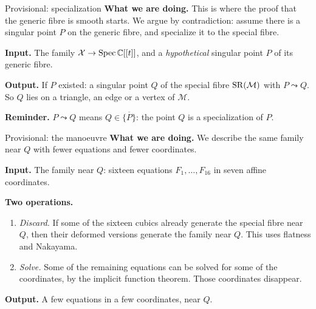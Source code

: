 \begin{frame}{Provisional: specialization}
\textbf{What we are doing.} This is where the proof that the generic fibre is smooth starts. We argue by contradiction: assume there is a singular point \(P\) on the generic fibre, and specialize it to the special fibre.
\par\bigskip
\textbf{Input.} The family \(\mathcal X\to\operatorname{Spec}\mathbb C[[t]]\), and a \emph{hypothetical} singular point \(P\) of its generic fibre.
\par\bigskip
\textbf{Output.} If \(P\) existed: a singular point \(Q\) of the special fibre \(\operatorname{SR}(\mathcal M)\) with \(P\leadsto Q\). So \(Q\) lies on a triangle, an edge or a vertex of \(\mathcal M\).
\par\bigskip
\textbf{Reminder.} \(P\leadsto Q\) means \(Q\in\overline{\{P\}}\): the point \(Q\) is a specialization of \(P\).
\end{frame}

\begin{frame}{Provisional: the manoeuvre}
\textbf{What we are doing.} We describe the same family near \(Q\) with fewer equations and fewer coordinates.
\par\bigskip
\textbf{Input.} The family near \(Q\): sixteen equations \(F_1,\dots,F_{16}\) in seven affine coordinates.
\par\bigskip
\textbf{Two operations.}
\begin{enumerate}
\setlength{\itemsep}{8pt}
\item \emph{Discard.} If some of the sixteen cubics already generate the special fibre near \(Q\), then their deformed versions generate the family near \(Q\). This uses flatness and Nakayama.
\item \emph{Solve.} Some of the remaining equations can be solved for some of the coordinates, by the implicit function theorem. Those coordinates disappear.
\end{enumerate}
\par\bigskip
\textbf{Output.} A few equations in a few coordinates, near \(Q\).
\end{frame}

